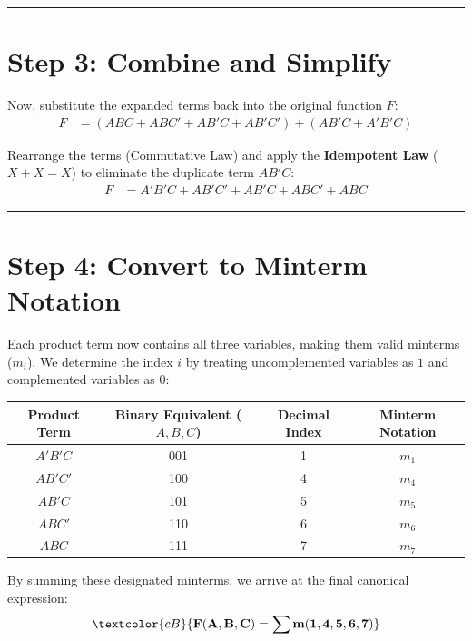 \documentclass[12pt,a3paper]{article}
\begin{document}
\begin{enumerate}
\begin{tcolorbox}[enhanced,breakable,ansbox,colback=cB!4,colframe=cB,boxrule=0.8pt,arc=5pt,title={\textbf{Answer}},fonttitle=\bfseries\color{white},colbacktitle=cB]
\vspace{0.2cm}
\hrule
\vspace{0.4cm}

\section*{Step 3: Combine and Simplify}

Now, substitute the expanded terms back into the original function $F$:
\begin{align*}
    F &= (ABC + ABC' + AB'C + AB'C') + (AB'C + A'B'C)
\end{align*}

Rearrange the terms (Commutative Law) and apply the \textbf{Idempotent Law} ($X + X = X$) to eliminate the duplicate term $AB'C$:
\begin{align*}
    F &= A'B'C + AB'C' + AB'C + ABC' + ABC
\end{align*}

\vspace{0.2cm}
\hrule
\vspace{0.4cm}

\section*{Step 4: Convert to Minterm Notation}

Each product term now contains all three variables, making them valid minterms ($m_i$). We determine the index $i$ by treating uncomplemented variables as $1$ and complemented variables as $0$:

\begin{center}
\renewcommand{\arraystretch}{1.3}
\begin{tabular}{c c c c}
    \toprule
    \textbf{Product Term} & \textbf{Binary Equivalent ($A, B, C$)} & \textbf{Decimal Index} & \textbf{Minterm Notation} \\
    \midrule
    $A'B'C$ & 001 & 1 & $m_1$ \\
    $AB'C'$ & 100 & 4 & $m_4$ \\
    $AB'C$  & 101 & 5 & $m_5$ \\
    $ABC'$  & 110 & 6 & $m_6$ \\
    $ABC$   & 111 & 7 & $m_7$ \\
    \bottomrule
\end{tabular}
\end{center}

By summing these designated minterms, we arrive at the final canonical expression:
\begin{equation}
    \textcolor{cB}{\mathbf{F(A, B, C) = \sum m(1, 4, 5, 6, 7)}}
\end{equation}


\end{tcolorbox}
\end{enumerate}
\end{document}
